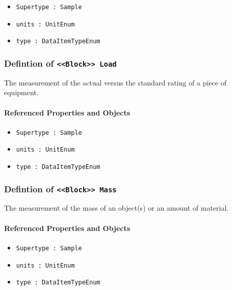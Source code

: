 \begin{itemize}
\item \texttt{Supertype : Sample}

\item \texttt{units : UnitEnum}

\item \texttt{type : DataItemTypeEnum}

\end{itemize}
\FloatBarrier
\subsubsection{Defintion of \texttt{<<Block>> Load}}
  \label{type:Load}

\FloatBarrier

The measurement of the actual versus the standard rating of a piece of equipment.

\FloatBarrier
\paragraph{Referenced Properties and Objects}

\begin{itemize}
\item \texttt{Supertype : Sample}

\item \texttt{units : UnitEnum}

\item \texttt{type : DataItemTypeEnum}

\end{itemize}
\FloatBarrier
\subsubsection{Defintion of \texttt{<<Block>> Mass}}
  \label{type:Mass}

\FloatBarrier

The measurement of the mass of an object(s) or an amount of material.

\FloatBarrier
\paragraph{Referenced Properties and Objects}

\begin{itemize}
\item \texttt{Supertype : Sample}

\item \texttt{units : UnitEnum}

\item \texttt{type : DataItemTypeEnum}

\end{itemize}
\FloatBarrier
